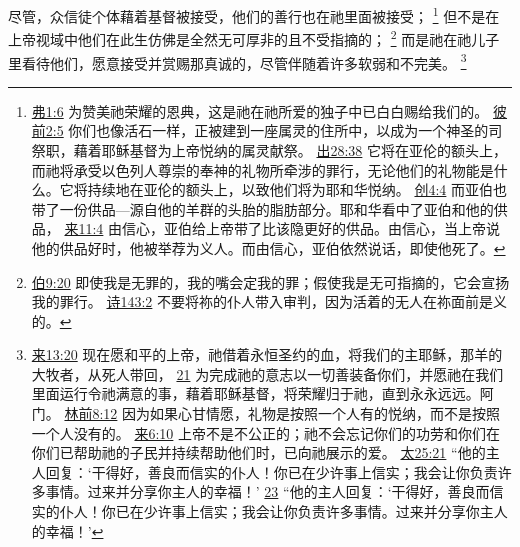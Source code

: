 \documentclass[12pt, a4paper, oneside]{ctexart}
\newcounter{parnum}[section]
\newcommand{\N}{%
   \noindent\refstepcounter{parnum}%
    \makebox[\parindent][l]{\textbf{\arabic{parnum}.}}}
\begin{document}
\N 尽管，众信徒个体藉着基督被接受，他们的善行也在祂里面被接受；
	\footnote {
		\href{https://biblehub.com/ephesians/1-6.htm}{弗1:6} 为赞美祂荣耀的恩典，这是祂在祂所爱的独子中已白白赐给我们的。
		\href{https://biblehub.com/1_peter/2-5.htm}{彼前2:5} 你们也像活石一样，正被建到一座属灵的住所中，以成为一个神圣的司祭职，藉着耶稣基督为上帝悦纳的属灵献祭。
		\href{https://biblehub.com/exodus/28-38.htm}{出28:38} 它将在亚伦的额头上，而祂将承受以色列人尊崇的奉神的礼物所牵涉的罪行，无论他们的礼物能是什么。它将持续地在亚伦的额头上，以致他们将为耶和华悦纳。
		\href{https://biblehub.com/genesis/4-4.htm}{创4:4} 而亚伯也带了一份供品---源自他的羊群的头胎的脂肪部分。耶和华看中了亚伯和他的供品，
		\href{https://biblehub.com/hebrews/11-4.htm}{来11:4} 由信心，亚伯给上帝带了比该隐更好的供品。由信心，当上帝说他的供品好时，他被举荐为义人。而由信心，亚伯依然说话，即使他死了。
	}
	但不是在上帝视域中他们在此生仿佛是全然无可厚非的且不受指摘的；
	\footnote {
		\href{https://biblehub.com/job/9-20.htm}{伯9:20} 即使我是无罪的，我的嘴会定我的罪；假使我是无可指摘的，它会宣扬我的罪行。
		\href{https://biblehub.com/psalms/143-2.htm}{诗143:2} 不要将祢的仆人带入审判，因为活着的无人在祢面前是义的。
	}
	而是祂在祂儿子里看待他们，愿意接受并赏赐那真诚的，尽管伴随着许多软弱和不完美。
	\footnote {
		\href{https://biblehub.com/hebrews/13-20.htm}{来13:20} 现在愿和平的上帝，祂借着永恒圣约的血，将我们的主耶稣，那羊的大牧者，从死人带回，
		\href{https://biblehub.com/hebrews/13-21.htm}{21} 为完成祂的意志以一切善装备你们，并愿祂在我们里面运行令祂满意的事，藉着耶稣基督，将荣耀归于祂，直到永永远远。阿门。
		\href{https://biblehub.com/2_corinthians/8-12.htm}{林前8:12} 因为如果心甘情愿，礼物是按照一个人有的悦纳，而不是按照一个人没有的。
		\href{https://biblehub.com/hebrews/6-10.htm}{来6:10} 上帝不是不公正的；祂不会忘记你们的功劳和你们在你们已帮助祂的子民并持续帮助他们时，已向祂展示的爱。
		\href{https://biblehub.com/matthew/25-21.htm}{太25:21} “他的主人回复：‘干得好，善良而信实的仆人！你已在少许事上信实；我会让你负责许多事情。过来并分享你主人的幸福！’
		\href{https://biblehub.com/matthew/25-23.htm}{23} “他的主人回复：‘干得好，善良而信实的仆人！你已在少许事上信实；我会让你负责许多事情。过来并分享你主人的幸福！’
	}
\end{document}
